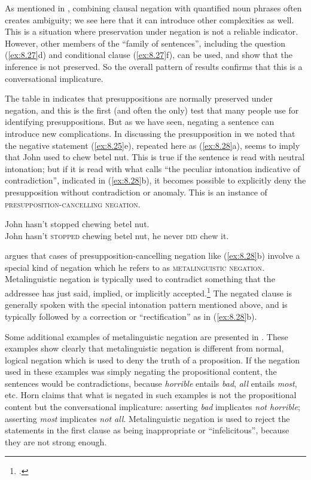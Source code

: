 As mentioned in , combining clausal negation with quantified noun phrases often creates ambiguity; we see here that it can introduce other complexities as well. This is a situation where preservation under negation is not a reliable indicator. However, other members of the “family of sentences”, including the question (\ref{ex:8.27}d) and conditional clause (\ref{ex:8.27}f), can be used, and show that the inference is not preserved. So the overall pattern of results confirms that this is a conversational implicature.



The table in  indicates that presuppositions are normally preserved under negation, and this is the first (and often the only) test that many people use for identifying presuppositions. But as we have seen, negating a sentence can introduce new complications. In discussing the presupposition in  we noted that the negative statement (\ref{ex:8.25}e), repeated here as (\ref{ex:8.28}a), seems to imply that John used to chew betel nut. This is true if the sentence is read with neutral intonation; but if it is read with what \citet{Jespersen1933} calls “the peculiar intonation indicative of contradiction”, indicated in (\ref{ex:8.28}b), it becomes possible to explicitly deny the presupposition without contradiction or anomaly. This is an instance of \textsc{presupposition-cancelling negation}.

\ea \label{ex:8.28}
\ea John hasn’t stopped chewing betel nut.\\
\ex John hasn’t \textsc{stopped} chewing betel nut, he never \textsc{did} chew it.
                       \z
\z

\citet{Horn1985,Horn1989} argues that cases of presupposition-cancelling negation like (\ref{ex:8.28}b) involve a special kind of negation which he refers to as \textsc{metalinguistic} \textsc{negation}. Metalinguistic negation is typically used to contradict something that the addressee has just said, implied, or implicitly accepted.\footnote{\citet[46--47]{KarttunenPeters1979}.} The negated clause is generally spoken with the special intonation pattern mentioned above, and is typically followed by a correction or “rectification” as in (\ref{ex:8.28}b).



Some additional examples of metalinguistic negation are presented in . These examples show clearly that metalinguistic negation is different from normal, logical negation which is used to deny the truth of a proposition. If the negation used in these examples was simply negating the propositional content, the sentences would be contradictions, because \textit{horrible} entails \textit{bad}, \textit{all} entails \textit{most}, etc. Horn claims that what is negated in such examples is not the propositional content but the conversational implicature: asserting \textit{bad} implicates \textit{not horrible}; asserting \textit{most} implicates \textit{not all}. Metalinguistic negation is used to reject the statements in the first clause as being inappropriate or “infelicitous”, because they are not strong enough.


